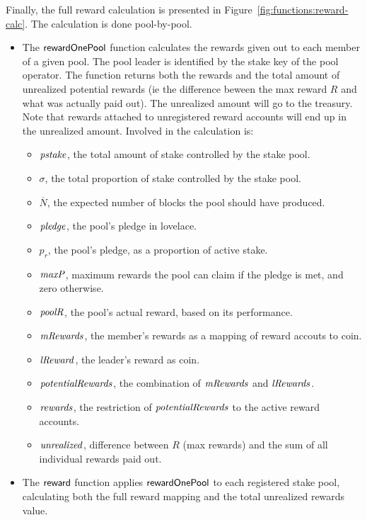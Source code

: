 Finally, the full reward calculation is presented in Figure~\ref{fig:functions:reward-calc}.
The calculation is done pool-by-pool.
\begin{itemize}
  \item The $\mathsf{rewardOnePool}$ function calculates the rewards given out to each member of a
    given pool. The pool leader is identified by the stake key of the pool operator.  The function
    returns both the rewards and the total amount of unrealized potential rewards (ie the
    difference beween the max reward $R$ and what was actually paid out).  The unrealized
    amount will go to the treasury. Note that rewards attached to unregistered reward accounts
    will end up in the unrealized amount.
    Involved in the calculation is:
    \begin{itemize}
      \item $\mathit{pstake}$, the total amount of stake controlled by the stake pool.
      \item $\sigma$, the total proportion of stake controlled by the stake pool.
      \item $\overline{N}$, the expected number of blocks the pool should have produced.
      \item $\mathit{pledge}$, the pool's pledge in lovelace.
      \item $p_r$, the pool's pledge, as a proportion of active stake.
      \item $\mathit{maxP}$, maximum rewards the pool can claim if the pledge is met,
        and zero otherwise.
      \item $\mathit{poolR}$, the pool's actual reward, based on its performance.
      \item $\mathit{mRewards}$, the member's rewards as a mapping of reward accouts to coin.
      \item $\mathit{lReward}$, the leader's reward as coin.
      \item $\mathit{potentialRewards}$, the combination of $\mathit{mRewards}$ and $\mathit{lRewards}$.
      \item $\mathit{rewards}$, the restriction of $\mathit{potentialRewards}$ to the active
        reward accounts.
      \item $\mathit{unrealized}$, difference between $R$ (max rewards) and the sum of all
        individual rewards paid out.
    \end{itemize}
  \item The $\mathsf{reward}$ function applies $\mathsf{rewardOnePool}$ to each registered stake
    pool, calculating both the full reward mapping and the total unrealized rewards value.
\end{itemize}

